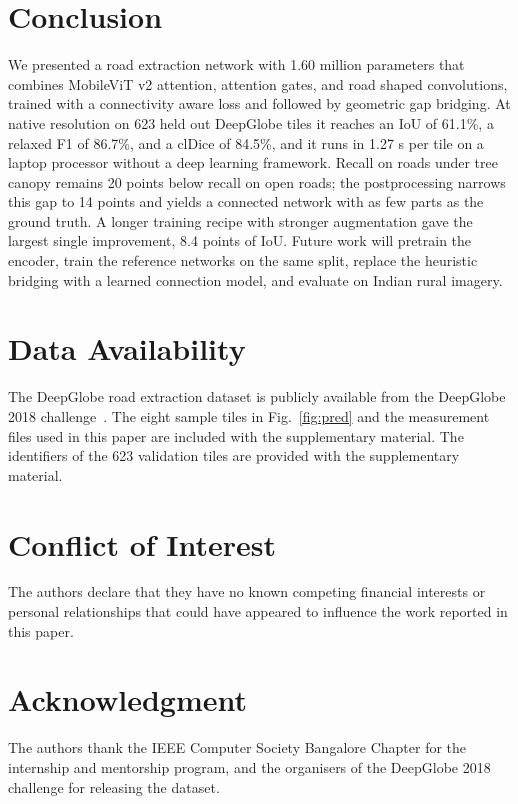 \documentclass{ieeeaccess}
\begin{document}
\section{Conclusion}
\label{sec:conclusion}

We presented a road extraction network with 1.60 million parameters that combines MobileViT v2 attention, attention gates, and road shaped convolutions, trained with a connectivity aware loss and followed by geometric gap bridging. At native resolution on 623 held out DeepGlobe tiles it reaches an IoU of 61.1\%, a relaxed F1 of 86.7\%, and a clDice of 84.5\%, and it runs in 1.27 s per tile on a laptop processor without a deep learning framework. Recall on roads under tree canopy remains 20 points below recall on open roads; the postprocessing narrows this gap to 14 points and yields a connected network with as few parts as the ground truth. A longer training recipe with stronger augmentation gave the largest single improvement, 8.4 points of IoU. Future work will pretrain the encoder, train the reference networks on the same split, replace the heuristic bridging with a learned connection model, and evaluate on Indian rural imagery.

\section*{Data Availability}

The DeepGlobe road extraction dataset is publicly available from the DeepGlobe 2018 challenge~\cite{demir2018deepglobe}. The eight sample tiles in Fig.~\ref{fig:pred} and the measurement files used in this paper are included with the supplementary material. The identifiers of the 623 validation tiles are provided with the supplementary material.

\section*{Conflict of Interest}

The authors declare that they have no known competing financial interests or personal relationships that could have appeared to influence the work reported in this paper.

\section*{Acknowledgment}

The authors thank the IEEE Computer Society Bangalore Chapter for the internship and mentorship program, and the organisers of the DeepGlobe 2018 challenge for releasing the dataset.
\end{document}
